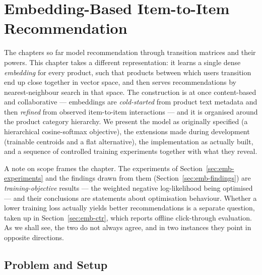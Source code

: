 %
\chapter{Embedding-Based Item-to-Item Recommendation}
\label{ch:embedding}

The chapters so far model recommendation through transition matrices and their
powers. This chapter takes a different representation: it learns a single dense
\emph{embedding} for every product, such that products between which users
transition end up close together in vector space, and then serves
recommendations by nearest-neighbour search in that space. The construction is
at once content-based and collaborative --- embeddings are \emph{cold-started}
from product text metadata and then \emph{refined} from observed item-to-item
interactions --- and it is organised around the product category hierarchy. We
present the model as originally specified (a hierarchical cosine-softmax
objective), the extensions made during development (trainable centroids and a
flat alternative), the implementation as actually built, and a sequence of
controlled training experiments together with what they reveal.

A note on scope frames the chapter. The experiments of
Section~\ref{sec:emb-experiments} and the findings drawn from them
(Section~\ref{sec:emb-findings}) are \emph{training-objective} results --- the
weighted negative log-likelihood being optimised --- and their conclusions are
statements about optimisation behaviour. Whether a lower training loss actually
yields better recommendations is a separate question, taken up in
Section~\ref{sec:emb-ctr}, which reports offline click-through evaluation. As we
shall see, the two do not always agree, and in two instances they point in
opposite directions.

\section{Problem and Setup}
\label{sec:emb-problem}

